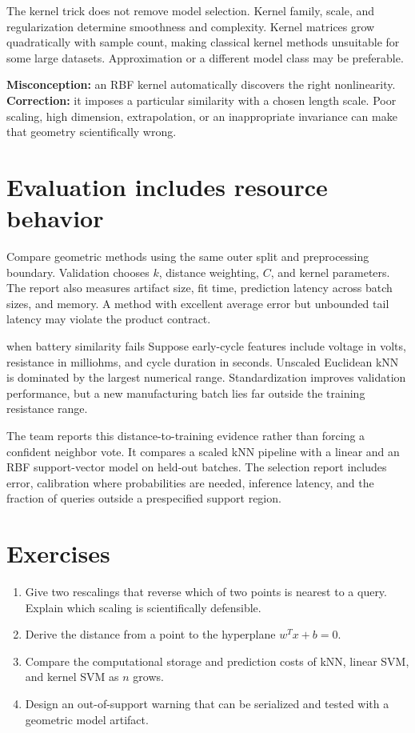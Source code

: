 The kernel trick does not remove model selection. Kernel family, scale, and
regularization determine smoothness and complexity. Kernel matrices grow
quadratically with sample count, making classical kernel methods unsuitable for
some large datasets. Approximation or a different model class may be preferable.

\begin{misconceptionbox}
\textbf{Misconception:} an RBF kernel automatically discovers the right
nonlinearity. \textbf{Correction:} it imposes a particular similarity with a
chosen length scale. Poor scaling, high dimension, extrapolation, or an
inappropriate invariance can make that geometry scientifically wrong.
\end{misconceptionbox}

\section{Evaluation includes resource behavior}

Compare geometric methods using the same outer split and preprocessing
boundary. Validation chooses $k$, distance weighting, $C$, and kernel parameters.
The report also measures artifact size, fit time, prediction latency across
batch sizes, and memory. A method with excellent average error but unbounded
tail latency may violate the product contract.

\begin{workedexample}{when battery similarity fails}
Suppose early-cycle features include voltage in volts, resistance in milliohms,
and cycle duration in seconds. Unscaled Euclidean kNN is dominated by the
largest numerical range. Standardization improves validation performance, but a
new manufacturing batch lies far outside the training resistance range.

The team reports this distance-to-training evidence rather than forcing a
confident neighbor vote. It compares a scaled kNN pipeline with a linear and an
RBF support-vector model on held-out batches. The selection report includes
error, calibration where probabilities are needed, inference latency, and the
fraction of queries outside a prespecified support region.
\end{workedexample}

\section{Exercises}
\begin{enumerate}
  \item Give two rescalings that reverse which of two points is nearest to a
  query. Explain which scaling is scientifically defensible.
  \item Derive the distance from a point to the hyperplane $w^Tx+b=0$.
  \item Compare the computational storage and prediction costs of kNN, linear
  SVM, and kernel SVM as $n$ grows.
  \item Design an out-of-support warning that can be serialized and tested with
  a geometric model artifact.
\end{enumerate}

